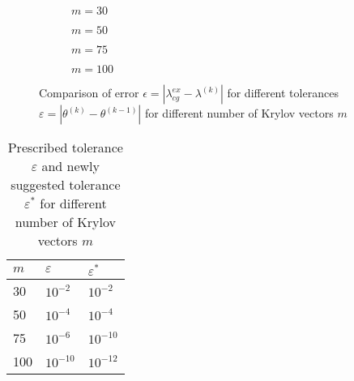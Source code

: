 \documentclass[11pt,a4paper]{article}
\begin{document}
\begin{figure}[h!]
	\centering
	\begin{subfigure}[h!]{0.5\textwidth}
		\begin{center}
			\resizebox{0.37\width}{!}{}
			\caption{$m=30$}
			\label{fig::m30}
		\end{center}	
	\end{subfigure}
	\begin{subfigure}[h!]{0.49\textwidth}
		\resizebox{0.37\width}{!}{}
		\caption{$m=50$}
		\label{fig::m50}
	\end{subfigure}
	\begin{subfigure}[h!]{0.5\textwidth}
		\begin{center}
			\resizebox{0.37\width}{!}{}
			\caption{$m=75$}
			\label{fig::m75}
		\end{center}	
	\end{subfigure}
	\begin{subfigure}[h!]{0.49\textwidth}
		\resizebox{0.37\width}{!}{}
		\caption{$m=100$}
		\label{fig::m100}
	\end{subfigure}
	\caption{\label{fig::mLanc} Comparison of error $\epsilon = |\lambda_{cg}^{ex} - \lambda^{(k)}|$ for different tolerances $\varepsilon = |\theta^{(k)} - \theta^{(k-1)}|$ for different number of Krylov vectors $m$}
\end{figure}

\renewcommand{\arraystretch}{2}
\begin{table}[h!]
	\begin{center}
		\begin{tabular}{ p{2cm} p{2cm} p{2cm}}
			\hline
			\hline
			$m$ & $\varepsilon$ & $\varepsilon^*$ \\
			\hline
			\hline
			30 &  $10^{-2}$ & $10^{-2}$\\
			\hline
			50 & $10^{-4}$ & $10^{-4}$\\
			\hline
			75 & $10^{-6}$ & $10^{-10}$\\
			\hline
			100 & $10^{-10}$ & $10^{-12}$\\
			\hline
			\hline
		\end{tabular}
		\caption{\label{tab:Tol}  Prescribed tolerance $\varepsilon$ and newly suggested tolerance $\varepsilon^*$ for different number of Krylov vectors $m$}
	\end{center}
\end{table}
\renewcommand{\arraystretch}{1}
\end{document}
